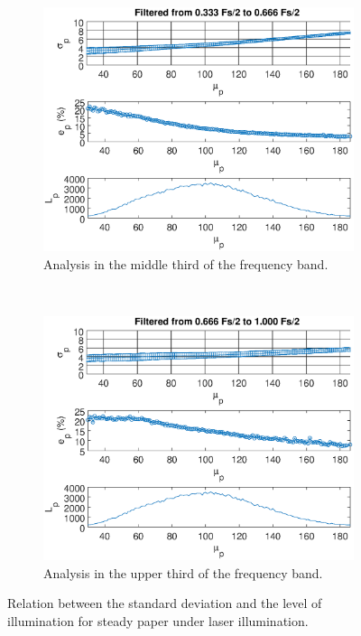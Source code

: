 \documentclass[review]{elsarticle}
\begin{document}
\begin{figure}[h!]
    ~\\ 
    \begin{subfigure}[b]{0.475\textwidth}
        \includegraphics[width=\textwidth]{stdy_curve.eps}
	\caption{Analysis in the middle third of the frequency band.}
        \label{fig:illlevel_stdy}
    \end{subfigure}
  ~
    \begin{subfigure}[b]{0.475\textwidth}
        \includegraphics[width=\textwidth]{stdz_curve.eps}
	\caption{Analysis in the upper third of the frequency band.}
        \label{fig:illlevel_stdz}
    \end{subfigure}
    
    \caption{Relation between the standard deviation and the level of illumination for steady paper under laser illumination.}
    \label{fig:papelilllevel}
\end{figure}
\end{document}
